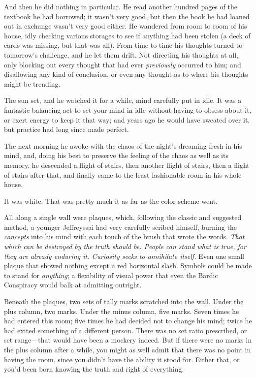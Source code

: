 {
 And then he did nothing in particular. He read another hundred
pages of the textbook he had borrowed; it wasn't very
good, but then the book he had loaned out in exchange
wasn't very good either. He wandered from room to room
of his house, idly checking various storages to see if anything had
been stolen (a deck of cards was missing, but that was all). From time
to time his thoughts turned to tomorrow's challenge,
and he let them drift. Not directing his thoughts at all, only blocking
out every thought that had ever \textit{previously} occurred to him;
and disallowing any kind of conclusion, or even any thought as to where
his thoughts might be trending.}

{
 The sun set, and he watched it for a while, mind carefully put in
idle. It was a fantastic balancing act to set your mind in idle without
having to obsess about it, or exert energy to keep it that way; and
years ago he would have sweated over it, but practice had long since
made perfect.}

{
 The next morning he awoke with the chaos of the
night's dreaming fresh in his mind, and, doing his best
to preserve the feeling of the chaos as well as its memory, he
descended a flight of stairs, then another flight of stairs, then a
flight of stairs after that, and finally came to the least fashionable
room in his whole house.}

{
 It was white. That was pretty much it as far as the color scheme
went.}

{
 All along a single wall were plaques, which, following the classic
and suggested method, a younger Jeffreyssai had very carefully scribed
himself, burning the \textit{concepts} into his mind with each touch of
the brush that wrote the words. \textit{That which can be destroyed by
the truth should be. People can stand what is true, for they are
already enduring it. Curiosity seeks to annihilate itself.} Even one
small plaque that showed nothing except a red horizontal slash. Symbols
could be made to stand for \textit{anything}; a flexibility of visual
power that even the Bardic Conspiracy would balk at admitting
outright.}

{
 Beneath the plaques, two sets of tally marks scratched into the
wall. Under the plus column, two marks. Under the minus column, five
marks. Seven times he had entered this room; five times he had decided
not to change his mind; twice he had exited something of a different
person. There was no set ratio prescribed, or set range---that would
have been a mockery indeed. But if there were no marks in the plus
column after a while, you might as well admit that there was no point
in having the room, since you didn't have the ability
it stood for. Either that, or you'd been born knowing
the truth and right of everything.}

